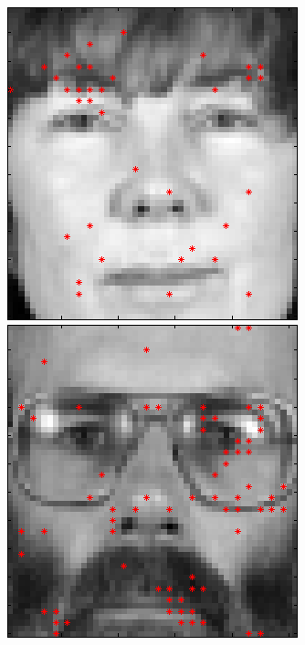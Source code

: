 \begin{figure}[ht]
 \includegraphics[width=\textwidth*11/100]{ch5/figures/FeaturesonFace_BGC7.png}
 \includegraphics[width=\textwidth*11/100]{ch5/figures/FeaturesonFace_BGC8.png}\\

\end{figure}

